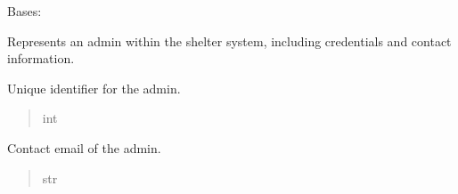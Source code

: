 \documentclass[letterpaper,10pt,english]{sphinxmanual}
\begin{document}
\begin{fulllineitems}
\label{\detokenize{app.models:app.models.admin.Admin}}
\pysigstartsignatures
\pysiglinewithargsret
{}
{\sphinxparamcomma {}\sphinxparamcomma {}\sphinxparamcomma {}\sphinxparamcomma {}}
{}
\pysigstopsignatures
\sphinxAtStartPar
Bases: 

\sphinxAtStartPar
Represents an admin within the shelter system, including credentials and contact information.

\begin{fulllineitems}
\label{\detokenize{app.models:app.models.admin.Admin.idAdmin}}
\pysigstartsignatures
\pysigline
{}
\pysigstopsignatures
\sphinxAtStartPar
Unique identifier for the admin.
\begin{quote}\begin{description}
\sphinxAtStartPar
int

\end{description}\end{quote}

\end{fulllineitems}


\begin{fulllineitems}
\label{\detokenize{app.models:app.models.admin.Admin.email}}
\pysigstartsignatures
\pysigline
{}
\pysigstopsignatures
\sphinxAtStartPar
Contact email of the admin.
\begin{quote}\begin{description}
\sphinxAtStartPar
str

\end{description}\end{quote}


\end{fulllineitems}
\end{fulllineitems}
\end{document}
